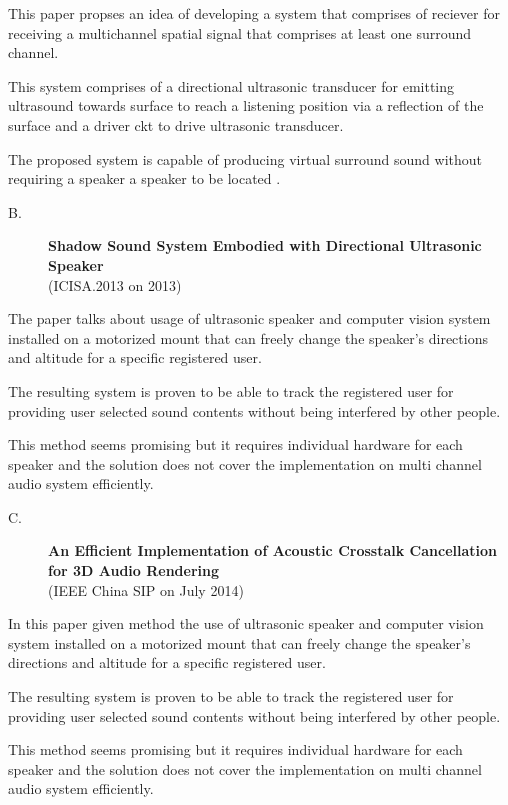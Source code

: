 \documentclass[twocolumn]{report}
\begin{document}
This paper propses an idea of developing a system that comprises of 
reciever for receiving a multichannel spatial signal that comprises
at least one surround channel.

This system comprises of a directional  ultrasonic transducer for 
emitting ultrasound towards surface to reach a listening position via 
a reflection of the surface and a driver ckt to drive ultrasonic transducer.

The proposed system is capable of producing virtual surround sound without 
requiring a speaker a speaker to be located .

\begin{description}
    \item[B.]\textbf{Shadow Sound System Embodied with Directional Ultrasonic Speaker}\\(ICISA.2013 on 2013) 
\end{description}

The paper talks about usage of ultrasonic speaker and computer vision 
system installed on a motorized mount that can freely change the 
speaker’s directions and altitude for a specific registered user.

The resulting system is proven to be able to track the registered 
user for providing user selected sound contents without being 
interfered by other people.

This method seems promising but it requires individual hardware 
for each speaker and the solution does not cover the implementation 
on multi channel audio system efficiently.

\begin{description}
    \item[C.]\textbf{An Efficient Implementation of Acoustic Crosstalk Cancellation for 3D Audio Rendering}\\(IEEE China SIP on July 2014)    
\end{description}

In this paper given method the use of ultrasonic speaker and computer 
vision system installed on a motorized mount that can freely change 
the speaker’s directions and altitude for a specific registered user.

The resulting system is proven to be able to track the registered user 
for providing user selected sound contents without being interfered 
by other people.

This method seems promising but it requires individual hardware for 
each speaker and the solution does not cover the implementation on 
multi channel audio system efficiently.
\end{document}
